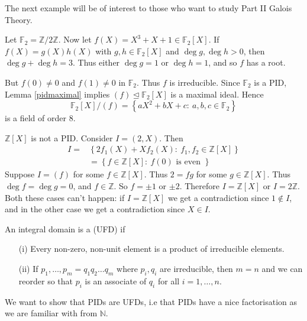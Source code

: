 \documentclass[egregdoesnotlikesansseriftitles,a4paper]{scrartcl}
\begin{document}
The next example will be of interest to those who want to study Part II Galois Theory.
\begin{example*}
       Let $\mathbb{F}_2 =\mathbb{Z}/2\mathbb{Z}$. Now let $f (X)=X^3 +X+1 \in \mathbb{F}_{2}[X]$. If $f (X)=g (X)h (X)$ with $g, h \in \mathbb{F}_{2}[X]$ and $\operatorname{deg}g , \operatorname{deg}h >0$, then $\operatorname{deg}g+ \operatorname{deg}h=3$. Thus either $\operatorname{deg}g =1$ or $\operatorname{deg}h=1$, and so $f$ has a root. 

       But $f (0 )\neq 0$ and $f (1)\neq 0$ in $\mathbb{F}_{2}$. Thus $f$ is irreducible. Since $\mathbb{F}_{2}$ is a PID, Lemma \ref{pidmaximal} implies $(f) \unlhd \mathbb{F}_{2}[X]$ is a maximal ideal. Hence \[
            \mathbb{F}_{2}[X]/(f)=\left\{aX^2+bX+c: \ a,b,c \in \mathbb{F}_{2}\right\}
       \] is a field of order 8.
\end{example*}
\begin{example}\label{ZX not PID}
       $\mathbb{Z}[X]$ is not a PID. Consider $I = (2,X)$. Then
       \begin{align*}
            I=&\left\{2f_1 (X)+X f_2 (X): \ f_1 ,f_2 \in \mathbb{Z}[X]\right\}\\
            &=\left\{f \in \mathbb{Z}[X]: \ f (0)\text{ is even } \right\}
       \end{align*}
       Suppose $I= (f)$ for some $f \in \mathbb{Z}[X]$. Thus $2=fg$ for some $g \in \mathbb{Z}[X]$. Thus $\operatorname{deg}f=\operatorname{deg}g =0$, and $f \in \mathbb{Z}$. So $f= \pm 1 $ or $\pm 2$. Therefore $I=\mathbb{Z}[X]$ or $I=2\mathbb{Z}$. Both these cases can't happen: if $I=\mathbb{Z}[X]$ we get a contradiction since $1 \notin I$, and in the other case we get a contradiction since $X \in I$.
\end{example}
\begin{definition*}
       An integral domain is a  (UFD) if 
       \begin{itemize}
             \item[(i)] Every non-zero, non-unit element is a product of irreducible elements.
             \item[(ii)] If $p_1 ,\ldots, p_m =q_1 q_2 \ldots q_{m}$ where $p_{i}, q_i$ are irreducible, then $m=n$ and we can reorder so that $p_i$ is an associate of $q_{i}$ for all $i=1,\ldots,n$. 
       \end{itemize}
\end{definition*}
\begin{goal}
      We want to show that PIDs are UFDs, i.e that PIDs have a nice factorisation as we are familiar with from $\mathbb{N}$.
\end{goal}
\end{document}
